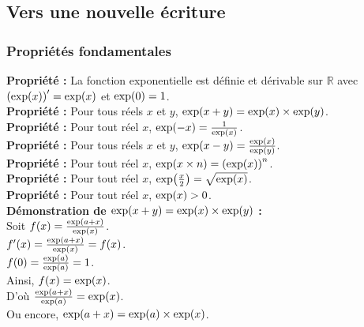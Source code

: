 \documentclass[a4paper,titlepage]{article}
\let\oldleft\left
\renewcommand{\left}{\mathopen{}\mathclose\bgroup\oldleft}
\let\oldright\right
\renewcommand{\right}{\aftergroup\egroup\oldright}
\begin{document}
    \subsection{Vers une nouvelle écriture}
        \subsubsection{Propriétés fondamentales}
            \textbf{Propriété :} La fonction exponentielle est définie et dérivable sur $\mathbb{R}$ avec $\left(\exp\left(x\right)\right)^{\prime}=\exp\left(x\right)$ et $\exp\left(0\right)=1$.
            \\
            \textbf{Propriété :} Pour tous réels $x$ et $y$, $\exp\left(x+y\right)=\exp\left(x\right)\times\exp\left(y\right)$.
            \\
            \textbf{Propriété :} Pour tout réel $x$, $\exp\left(-x\right)=\frac{1}{\exp\left(x\right)}$.
            \\
            \textbf{Propriété :} Pour tous réels $x$ et $y$, $\exp\left(x-y\right)=\frac{\exp\left(x\right)}{\exp\left(y\right)}$.
            \\
            \textbf{Propriété :} Pour tout réel $x$, $\exp\left(x\times n\right)=\left(\exp\left(x\right)\right)^{n}$.
            \\
            \textbf{Propriété :} Pour tout réel $x$, $\exp\left(\frac{x}{2}\right)=\sqrt{\exp\left(x\right)}$.
            \\
            \textbf{Propriété :} Pour tout réel $x$, $\exp\left(x\right)>0$.
            \\
            \textbf{\boldmath Démonstration de $\exp\left(x+y\right)=\exp\left(x\right)\times\exp\left(y\right)$ :}
            \\
            Soit $f\left(x\right)=\frac{\exp\left(a+x\right)}{\exp\left(x\right)}$.
            \\
            $f^{\prime}\left(x\right)=\frac{\exp\left(a+x\right)}{\exp\left(x\right)}=f\left(x\right)$.
            \\
            $f\left(0\right)=\frac{\exp\left(a\right)}{\exp\left(a\right)}=1$.
            \\
            Ainsi, $f\left(x\right)=\exp\left(x\right)$.
            \\
            D’où $\frac{\exp\left(a+x\right)}{\exp\left(a\right)}=\exp\left(x\right)$.
            \\
            Ou encore, $\exp\left(a+x\right)=\exp\left(a\right)\times\exp\left(x\right)$.
\end{document}
